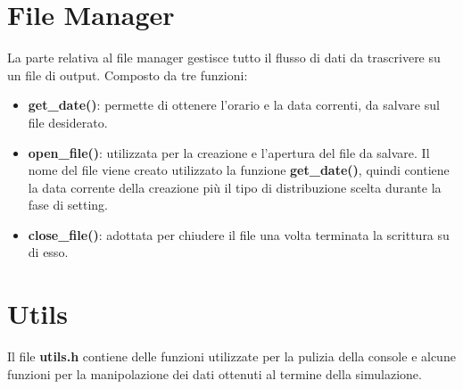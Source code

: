 \section{File Manager}
La parte relativa al file manager gestisce tutto il flusso di dati da 
trascrivere  su un file di output. Composto da tre funzioni:
\begin{itemize}
\item \textbf{get\_date()}: permette di ottenere l'orario e la data correnti, 
da 
salvare sul file desiderato.
\item \textbf{open\_file()}: utilizzata per la creazione e l'apertura 
del file da salvare. Il nome del file viene creato utilizzato la funzione 
\textbf{get\_date()}, quindi contiene la data corrente della creazione più il 
tipo di 
distribuzione scelta durante la fase di setting.
\item \textbf{close\_file()}: adottata per chiudere il file una volta 
terminata la scrittura su di esso.
\end{itemize}

\section{Utils}
Il file \textbf{utils.h} contiene delle funzioni utilizzate per la pulizia della 
console 
e alcune funzioni per la manipolazione dei dati ottenuti al termine della 
simulazione.

